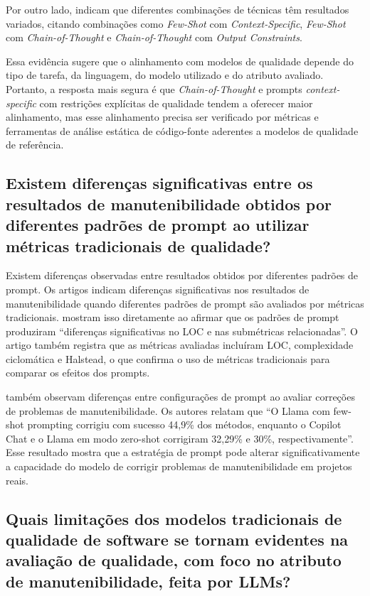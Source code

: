 Por outro lado, \cite{MartinezEtAll} indicam que diferentes combinações de técnicas têm resultados variados, citando combinações como \textit{Few-Shot} com \textit{Context-Specific}, \textit{Few-Shot} com \textit{Chain-of-Thought} e \textit{Chain-of-Thought} com \textit{Output Constraints}.

Essa evidência sugere que o alinhamento com modelos de qualidade depende do tipo de tarefa, da linguagem, do modelo utilizado e do atributo avaliado. Portanto, a resposta mais segura é que \textit{Chain-of-Thought} e prompts \textit{context-specific} com restrições explícitas de qualidade tendem a oferecer maior alinhamento, mas esse alinhamento precisa ser verificado por métricas e ferramentas de análise estática de código-fonte aderentes a modelos de qualidade de referência.

\subsection{Existem diferenças significativas entre os resultados de manutenibilidade obtidos por diferentes padrões de prompt ao utilizar métricas tradicionais de qualidade?}

Existem diferenças observadas entre resultados obtidos por diferentes padrões de prompt. Os artigos indicam diferenças significativas nos resultados de manutenibilidade quando diferentes padrões de prompt são avaliados por métricas tradicionais. 
 mostram isso diretamente ao afirmar que os padrões de prompt produziram ``diferenças significativas no LOC e nas submétricas relacionadas''. O artigo também registra que as métricas avaliadas incluíram LOC, complexidade ciclomática e Halstead, o que confirma o uso de métricas tradicionais para comparar os efeitos dos prompts. 

 também observam diferenças entre configurações de prompt ao avaliar correções de problemas de manutenibilidade. Os autores relatam que ``O Llama com few-shot prompting corrigiu com sucesso 44,9\% dos métodos, enquanto o Copilot Chat e o Llama em modo zero-shot corrigiram 32,29\% e 30\%, respectivamente''. Esse resultado mostra que a estratégia de prompt pode alterar significativamente a capacidade do modelo de corrigir problemas de manutenibilidade em projetos reais.

\subsection{Quais limitações dos modelos tradicionais de qualidade de software se tornam evidentes na avaliação de qualidade, com foco no atributo de manutenibilidade, feita por LLMs?}

